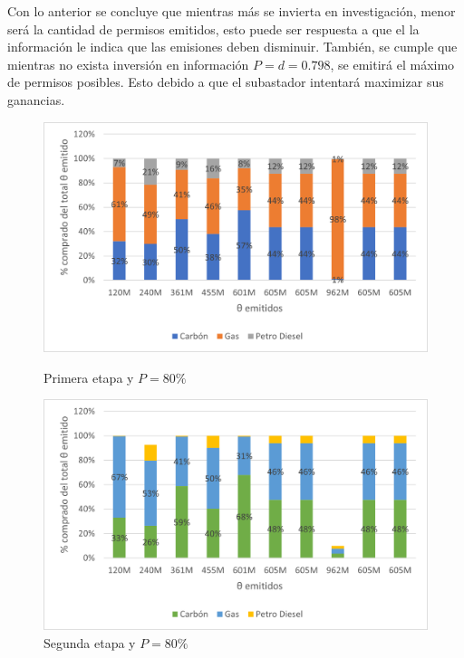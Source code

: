 Con lo anterior se concluye que mientras más se invierta en investigación, menor será la cantidad de permisos emitidos, esto puede ser respuesta a que el la información le indica que las emisiones deben disminuir. También, se cumple que mientras no exista inversión en información $P=d=0.798$, se emitirá el máximo de permisos posibles. Esto debido a que el subastador intentará maximizar sus ganancias.
\vspace{2.5mm}

\begin{figure}[H]
  \centering
  \begin{minipage}[b]{0.49\textwidth}
    \includegraphics[width=\textwidth]{docs/DocumentoMemoria/core/images/distribucion primera etapa.png}
    \caption{{\footnotesize Primera etapa y $P=80\%$}}
    \label{petapaPO}
  \end{minipage}
  \hfill
  \begin{minipage}[b]{0.49\textwidth}
    \includegraphics[width=\textwidth]{docs/DocumentoMemoria/core/images/distribucion segunda etapa.png}
    \caption{{\footnotesize Segunda etapa y $P=80\%$}}
    \label{setapaPO}
  \end{minipage}
\end{figure}

